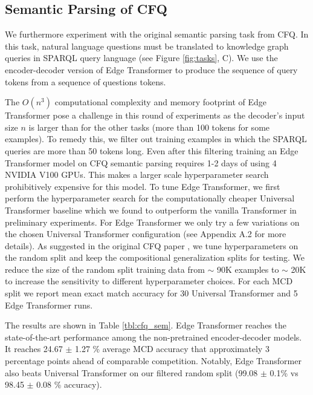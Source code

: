 \documentclass{article}
\begin{document}
\subsection{Semantic Parsing of CFQ}\label{sec:semantic-parsing}
\label{sec:cfq_sem}

We furthermore experiment with the original semantic parsing task from
CFQ. In this task, natural language questions must be translated to
knowledge graph queries in SPARQL query language (see Figure \ref{fig:tasks}, C). We use the encoder-decoder version of Edge Transformer to produce the sequence of query tokens from a sequence of questions tokens. 
 

The $O(n^3)$ computational complexity and memory footprint of Edge Transformer pose a challenge in this round of experiments as the decoder's input  size $n$ is larger than for the other tasks (more than 100 tokens for some examples). To remedy this, we filter out training examples in which the SPARQL queries are more than 50 tokens long. Even after this filtering training an Edge Transformer model on CFQ semantic parsing requires 1-2 days of using 4 NVIDIA V100 GPUs. This makes a larger scale hyperparameter search prohibitively expensive for this model. To tune Edge Transformer, we first perform the hyperparameter search for the computationally cheaper Universal Transformer baseline which we found to outperform the vanilla Transformer in preliminary experiments. For Edge Transformer we only try a few variations on the chosen Universal Transformer configuration (see Appendix A.2 for more details). As suggested in the original CFQ paper \citep{keysers_measuring_2020}, we tune hyperparameters on the random split and keep the compositional generalization splits for testing. We reduce the size of the random split training data from $\sim$ 90K examples to $\sim$ 20K
to increase the sensitivity to different hyperparameter choices. For each MCD split we report mean exact match accuracy for 30 Universal Transformer and 5 Edge Transformer runs. 

The results are shown in Table \ref{tbl:cfq_sem}. Edge Transformer reaches the state-of-the-art performance among the non-pretrained encoder-decoder models. It reaches 24.67 $\pm$ 1.27 \% average MCD accuracy that approximately 3 percentage points ahead of comparable competition. Notably, Edge Transformer also beats Universal Transformer on our filtered  random split (99.08 $\pm$ 0.1\% vs 98.45 $\pm$ 0.08 \% accuracy).
\end{document}
